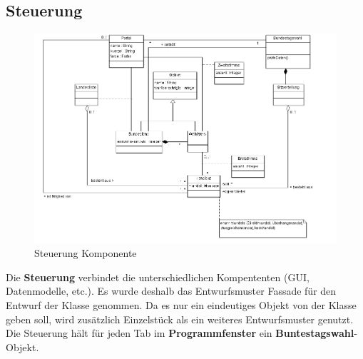 \documentclass[12pt,a4paper,titlepage]{article}
\newcommand{\myma}{\fontfamily{pcr}\selectfont \textbf}
\begin{document}
\newpage
\subsection{Steuerung}
\begin{figure}[!ht]
\includegraphics[scale=0.4]{Datenhaltung-Ausschnitt} \caption{Steuerung Komponente} 
\end{figure}
Die {\myma{Steuerung}} verbindet die unterschiedlichen Kompententen (GUI, Datenmodelle, etc.). Es wurde deshalb das Entwurfsmuster Fassade für den Entwurf der Klasse genommen. Da es nur ein eindeutiges Objekt von der Klasse geben soll, wird zusätzlich Einzelstück als ein weiteres Entwurfsmuster genutzt. Die Steuerung hält für jeden Tab im {\myma{Programmfenster}} ein {\myma{Buntestagswahl}}-Objekt.
\end{document}
